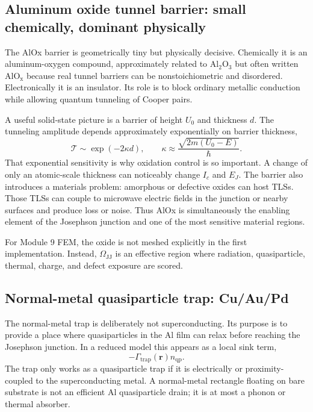 \documentclass[11pt]{article}
\begin{document}
\subsection{Aluminum oxide tunnel barrier: small chemically, dominant physically}
The AlOx barrier is geometrically tiny but physically decisive. Chemically it is an aluminum-oxygen compound, approximately related to $\mathrm{Al_2O_3}$ but often written $\mathrm{AlO_x}$ because real tunnel barriers can be nonstoichiometric and disordered. Electronically it is an insulator. Its role is to block ordinary metallic conduction while allowing quantum tunneling of Cooper pairs.

A useful solid-state picture is a barrier of height $U_0$ and thickness $d$. The tunneling amplitude depends approximately exponentially on barrier thickness,
\begin{equation}
    \mathcal{T} \sim \exp(-2\kappa d),
    \qquad
    \kappa \approx \frac{\sqrt{2m(U_0-E)}}{\hbar}.
\end{equation}
That exponential sensitivity is why oxidation control is so important. A change of only an atomic-scale thickness can noticeably change $I_c$ and $E_J$. The barrier also introduces a materials problem: amorphous or defective oxides can host TLSs. Those TLSs can couple to microwave electric fields in the junction or nearby surfaces and produce loss or noise. Thus AlOx is simultaneously the enabling element of the Josephson junction and one of the most sensitive material regions.

For Module 9 FEM, the oxide is not meshed explicitly in the first implementation. Instead, $\Omega_{\mathrm{JJ}}$ is an effective region where radiation, quasiparticle, thermal, charge, and defect exposure are scored.

\subsection{Normal-metal quasiparticle trap: Cu/Au/Pd}
The normal-metal trap is deliberately not superconducting. Its purpose is to provide a place where quasiparticles in the Al film can relax before reaching the Josephson junction. In a reduced model this appears as a local sink term,
\begin{equation}
    -\Gamma_{\mathrm{trap}}(\mathbf{r})n_{\mathrm{qp}}.
\end{equation}
The trap only works as a quasiparticle trap if it is electrically or proximity-coupled to the superconducting metal. A normal-metal rectangle floating on bare substrate is not an efficient Al quasiparticle drain; it is at most a phonon or thermal absorber.
\end{document}
